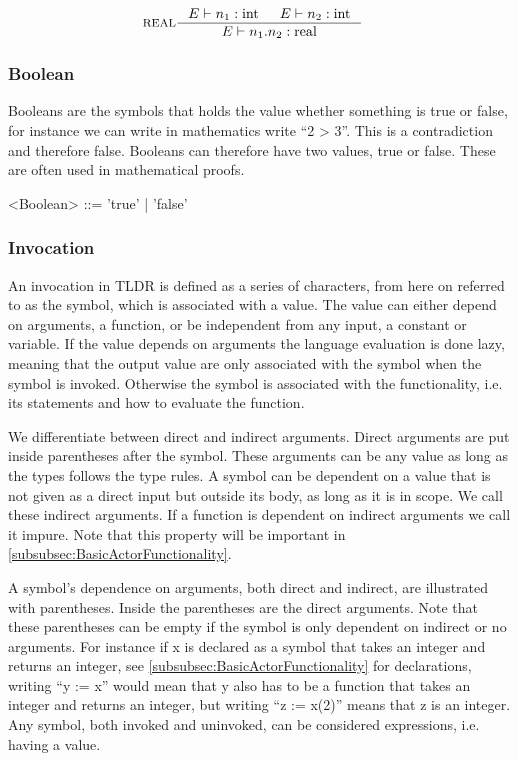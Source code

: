 \begin{align*}
&\inference[REAL]{\Tenv n_1:\Tint & \Tenv n_2:\Tint}
                 {\Tenv n_1.n_2: \Treal}
\end{align*}

\subsubsection{Boolean}
Booleans are the symbols that holds the value whether something is true or false, for instance we can write in mathematics write \enquote{2 > 3}. This is a contradiction and therefore false. Booleans can therefore have two values, true or false. These are often used in mathematical proofs.
\begin{grammar}
<Boolean> ::= 'true' | 'false'
\end{grammar}

\subsubsection{Invocation}\label{subsubsec:invocation}
An invocation in TLDR is defined as a series of characters, from here on referred to as the symbol, which is associated with a value. The value can either depend on arguments, a function, or be independent from any input, a constant or variable. If the value depends on arguments the language evaluation is done lazy, meaning that the output value are only associated with the symbol when the symbol is invoked. Otherwise the symbol is associated with the functionality, i.e. its statements and how to evaluate the function. 

We differentiate between direct and indirect arguments. Direct arguments are put inside parentheses after the symbol. These arguments can be any value as long as the types follows the type rules. A symbol can be dependent on a value that is not given as a direct input but outside its body, as long as it is in scope. We call these indirect arguments. If a function is dependent on indirect arguments we call it impure. Note that this property will be important in \cref{subsubsec:BasicActorFunctionality}. 

A symbol's dependence on arguments, both direct and indirect, are illustrated with parentheses. Inside the parentheses are the direct arguments. Note that these parentheses can be empty if the symbol is only dependent on indirect or no arguments. For instance if x is declared as a symbol that takes an integer and returns an integer, see \cref{subsubsec:BasicActorFunctionality} for declarations, writing \enquote{y := x} would mean that y also has to be a function that takes an integer and returns an integer, but writing \enquote{z := x(2)} means that z is an integer. Any symbol, both invoked and uninvoked, can be considered expressions, i.e. having a value.

